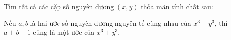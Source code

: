\ifshowproblem
\begin{problem}\label{example:BMO-2015-P4}
    Tìm tất cả các cặp số nguyên dương \( (x, y) \) thỏa mãn tính chất sau:

    Nếu \( a, b \) là hai ước số nguyên dương nguyên tố cùng nhau của \( x^3 + y^3 \),  
    thì \( a + b - 1 \) cũng là một ước của \( x^3 + y^3 \).
\end{problem}
\fi

\footnotemark
{}
\fi